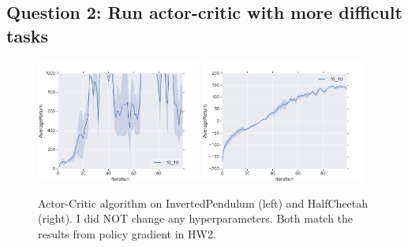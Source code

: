 \documentclass[12pt]{article}
\newcounter{question}
\begin{document}
  \pagebreak
  
  \subsection{Question 2: Run actor-critic with more difficult tasks}
  \begin{figure}[!htbp]
  	\includegraphics[width=0.48\textwidth]{question2_2a.png}
	\includegraphics[width=0.48\textwidth]{question2_2b.png}
	\label{fig:ac_diff}
	\caption[caption]{Actor-Critic algorithm on InvertedPendulum (left) and HalfCheetah (right).
	I did NOT change any hyperparameters. Both match the results from policy gradient in HW2.
	}
  \end{figure}
	
\end{document}

